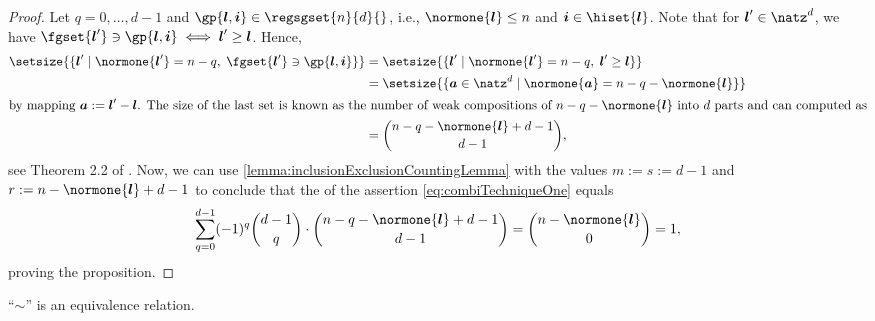 \propCombiTechniqueOne*

\begin{proof}
  Let $q = 0, \dotsc, d - 1$ and $\gp{\*l,\*i} \in \regsgset{n}{d}{}$, i.e.,
  $\normone{\*l} \le n$ and $\*i \in \hiset{\*l}$.
  Note that for $\*l' \in \natz^d$, we have
  $\fgset{\*l'} \ni \gp{\*l,\*i} \iff \*l' \ge \*l$.
  Hence,
  \begin{subequations}
    \begin{align}
      \setsize{
        \{\*l' \mid \normone{\*l'} = n - q,\; \fgset{\*l'} \ni \gp{\*l,\*i}\}
      }
      &= \setsize{
        \{\*l' \mid \normone{\*l'} = n - q,\; \*l' \ge \*l\}
      }\\
      &= \setsize{
        \{\*a \in \natz^d \mid \normone{\*a} = n - q - \normone{\*l}\}
      }\\
      \intertext{%
        by mapping $\*a := \*l' - \*l$.
        The size of the last set is
        known as the number of weak compositions
        of $n - q - \normone{\*l}$ into $d$ parts
        and can computed as%
      }
      &= \binom{n - q - \normone{\*l} + d - 1}{d - 1},
    \end{align}
  \end{subequations}
  see Theorem 2.2 of \cite{Miklos15Introduction}.
  Now, we can use \cref{lemma:inclusionExclusionCountingLemma}
  with the values
  $m := s := d - 1$ and
  $r := n - \normone{\*l} + d - 1$
  to conclude that the \lhs of the assertion
  \eqref{eq:combiTechniqueOne} equals
  \begin{equation}
    \sum_{q=0}^{d-1} (-1)^q \binom{d-1}{q} \cdot
    \binom{n - q - \normone{\*l} + d - 1}{d - 1}
    = \binom{n - \normone{\*l}}{0}
    = 1,
  \end{equation}
  proving the proposition.
\end{proof}

\begin{shortlemma}
  \label{lemma:combiTechniqueEquivalenceRelation}
  ``$\sim$'' is an equivalence relation.
\end{shortlemma}

